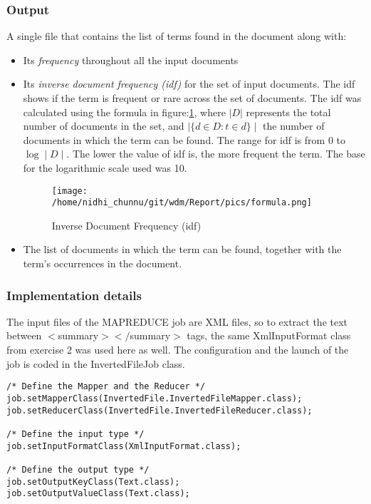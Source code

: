 \documentclass[a4paper,10pt]{article}
\begin{document}
\subsubsection{Output}
A single file that contains the list of terms found in the document along with:
 \begin{itemize}
 \item Its \emph{frequency} throughout all the input documents
 \item Its \emph{inverse document frequency (idf)} for the set of input documents.  The idf shows if the term is frequent or rare across the set of documents. The idf was calculated using the formula in figure:\ref{fig:idf}, where $|D|$ represents the total number of documents in the set, and ${\mid \lbrace d \in D:t \in d \rbrace\mid}$ the number of documents in which the term can be found. The range for idf is from 0 to $\log\mid D \mid$. The lower the value of idf is, the more frequent the term. The base for the logarithmic scale used was 10.

\begin{figure}[h!]
  \centering
    \texttt{[image: /home/nidhi\_chunnu/git/wdm/Report/pics/formula.png]}
    \caption{Inverse Document Frequency (idf)}
    \label{fig:idf}
\end{figure}

\item The list of documents in which the term can be found, together with the term’s  occurrences in the document.
\end{itemize}

\subsubsection{Implementation details}
The input files of the MAPREDUCE job are XML files, so to extract the text between $<$summary$></$summary$>$ tags, the same XmlInputFormat class from exercise 2 was used here as well. The configuration and the launch of the job is coded in the InvertedFileJob class.

\lstset{language=Java}
\begin{lstlisting}
/* Define the Mapper and the Reducer */
job.setMapperClass(InvertedFile.InvertedFileMapper.class);
job.setReducerClass(InvertedFile.InvertedFileReducer.class);

/* Define the input type */
job.setInputFormatClass(XmlInputFormat.class);

/* Define the output type */
job.setOutputKeyClass(Text.class);
job.setOutputValueClass(Text.class);
\end{lstlisting}
\end{document}
